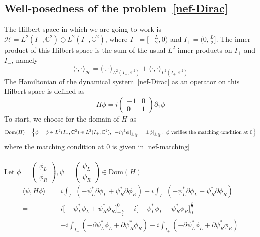 \subsection{Well-posedness of the problem~\cref{nef-Dirac}}\label{vacuum-subsect-sa}
The Hilbert space in which we are going to work is $\mathcal{H} = L^{2}(I_-, \mathbb{C}^2) \oplus L^{2}(I_+, \mathbb{C}^2)$,  where $I_- = [-\frac{L}{2}, 0)$ and $I_+ = (0, \frac{L}{2}]$.
The inner product of this Hilbert space is the sum of the usual $L^2$ inner products on $I_+$ and $I_-$, namely
\begin{equation*}
\langle \cdot, \cdot\rangle_{\mathcal{H} } = \langle \cdot, \cdot\rangle_{L^{2}(I_-, \mathbb{C}^2)} +\langle \cdot, \cdot\rangle_{L^{2}(I_+, \mathbb{C}^2)}
\end{equation*}
The Hamiltonian of the dynamical system~\cref{nef-Dirac} as an operator on this Hilbert space is defined as
\begin{equation}
H \phi = i \begin{pmatrix}
-1  &  0 \\
0  &  1  \end{pmatrix} \partial_1 \phi 
\end{equation}
To start, we choose for the domain of $H$ as 
\begin{equation*}
\mathrm{Dom}(H) = \Big \{\phi \enskip \big\vert \enskip \phi \in L^{2}(I_-, \mathbb{C}^2) \oplus L^{2}(I_+, \mathbb{C}^2), \enskip -i \gamma^1 \phi\vert_{\pm \frac{L}{2}} = \pm \phi \vert_{ \pm \frac{L}{2} }, \enskip \phi \textrm{ verifies the matching condition at 0} \Big \}
\end{equation*} 
where the matching condition at 0 is given in \cref{nef-matching}\\\\
Let $ \phi = \begin{pmatrix} \phi_L \\ \phi_R \end{pmatrix}, \psi = \begin{pmatrix} \psi_L \\ \psi_R \end{pmatrix} \in \mathrm{Dom}(H)$
\begin{equation}\label{sa-hamiltonian}
\begin{split}
\langle \psi, H \phi \rangle = & i \int_{I_-} ( - \psi_L^* \partial \phi_L + \psi_R^* \partial \phi_R )
+ i \int_{I_+} ( - \psi_L^* \partial \phi_L + \psi_R^* \partial \phi_R ) \\
= & i \big[-\psi_L^* \phi_L + \psi_R^* \phi_R \big]^{0^-}_{-\frac{L}{2}} + i \big[-\psi_L^* \phi_L + \psi_R^* \phi_R \big]_{0^+}^{\frac{L}{2}} \\
& - i \int_{I_-} ( - \partial \psi_L^* \phi_L + \partial \psi_R^*  \phi_R ) - i \int_{I_+} ( - \partial \psi_L^* \phi_L + \partial \psi_R^*  \phi_R ) 
\end{split}
\end{equation}
